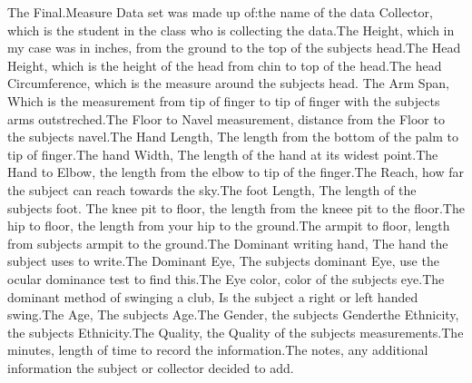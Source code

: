 \documentclass[]{article}
\begin{document}
The Final.Measure Data set was made up of:\newline the name of the data
Collector, which is the student in the class who is collecting the
data.\newline   The Height, which in my case was in inches, from the
ground to the top of the subjects head.\newline The Head Height, which
is the height of the head from chin to top of the head.\newline The head
Circumference, which is the measure around the subjects head.\newline
The Arm Span, Which is the measurement from tip of finger to tip of
finger with the subjects arms outstreched.\newline The Floor to Navel
measurement, distance from the Floor to the subjects navel.\newline The
Hand Length, The length from the bottom of the palm to tip of
finger.\newline The hand Width, The length of the hand at its widest
point.\newline The Hand to Elbow, the length from the elbow to tip of
the finger.\newline The Reach, how far the subject can reach towards the
sky.\newline The foot Length, The length of the subjects foot.\newline
The knee pit to floor, the length from the kneee pit to the
floor.\newline The hip to floor, the length from your hip to the
ground.\newline The armpit to floor, length from subjects armpit to the
ground.\newline The Dominant writing hand, The hand the subject uses to
write.\newline The Dominant Eye, The subjects dominant Eye, use the
ocular dominance test to find this.\newline The Eye color, color of the
subjects eye.\newline The dominant method of swinging a club, Is the
subject a right or left handed swing.\newline The Age, The subjects
Age.\newline The Gender, the subjects Gender\newline the Ethnicity, the
subjects Ethnicity.\newline The Quality, the Quality of the subjects
measurements.\newline The minutes, length of time to record the
information.\newline The notes, any additional information the subject
or collector decided to add.\newline
\label{sec:Provenance- Data Description}
\end{document}
